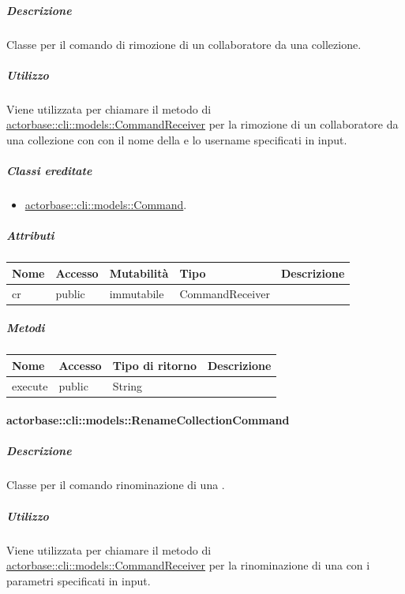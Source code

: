 \documentclass{scalatekids-article}
\begin{document}
\subparagraph{Descrizione}

Classe per il comando di rimozione di un collaboratore da una collezione.

\subparagraph{Utilizzo}

Viene utilizzata per chiamare il metodo di
\hyperref[sec:actorbase::cli::models::CommandReceiver]{actorbase::cli::models::CommandReceiver} per la rimozione di un collaboratore
da una collezione con con il nome della  e lo username
specificati in input.

\subparagraph{Classi ereditate}

\begin{itemize}
\item \hyperref[sec:actorbase::cli::models::Command]{actorbase::cli::models::Command}.
\end{itemize}

\subparagraph{Attributi}

\begin{tabular}{| l | l | l | l | l |}
  \hline
  Nome & Accesso & Mutabilità & Tipo & Descrizione\\
  \hline
  cr & public & immutabile & CommandReceiver & \\
  \hline
\end{tabular}

\subparagraph{Metodi}

\begin{tabular}{| l | l | l | l |}
  \hline
  Nome & Accesso & Tipo di ritorno & Descrizione\\
  \hline
  execute & public & String & \\
  \hline
\end{tabular}

\paragraph{actorbase::cli::models::RenameCollectionCommand}
\label{sec:actorbase::cli::models::RenameCollectionCommand}

\subparagraph{Descrizione}

Classe per il comando rinominazione di una .

\subparagraph{Utilizzo}

Viene utilizzata per chiamare il metodo di \hyperref[sec:actorbase::cli::models::CommandReceiver]{actorbase::cli::models::CommandReceiver} per la rinominazione di una  con i parametri specificati in input.
\end{document}
